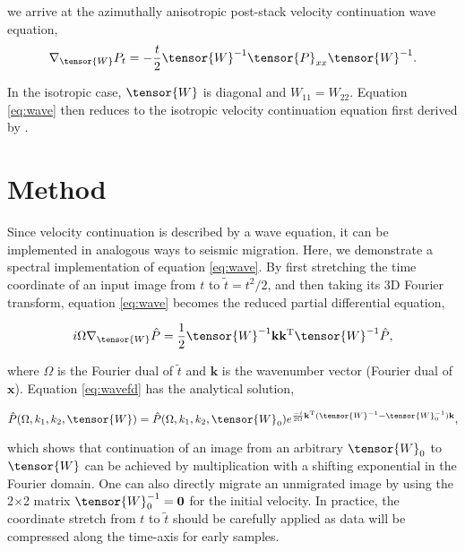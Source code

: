 \noindent we arrive at the azimuthally anisotropic post-stack velocity continuation wave equation,
\begin{equation}
\label{eq:wave}
\nabla _{\tensor{W}}P_t=-\frac{t}{2}\tensor{W}^{-1}\tensor{P}_{xx}\tensor{W}^{-1}.
\end{equation}

\noindent In the isotropic case, $\tensor{W}$ is diagonal and $W_{11}=W_{22}$.  
Equation \ref{eq:wave} then reduces to the isotropic velocity continuation equation first derived by \cite{Claerbout.sep.48.79}.

\section{Method}
Since velocity continuation is described by a wave equation, it can be implemented in analogous ways to seismic migration.  Here, we demonstrate a spectral implementation of equation \ref{eq:wave}.  
By first stretching the time coordinate of an input image from $t$ to $\tilde{t} =t^2/2$, and then taking its 3D Fourier transform, equation \ref{eq:wave} becomes the reduced partial differential equation,

\begin{equation}
\label{eq:wavefd}
i\Omega \nabla _{\tensor{W}}\hat{P} =\frac{1}{2}\tensor{W}^{-1}\mathbf{k}\mathbf{k}^{\mathrm{T}}\tensor{W}^{-1}\hat{P},
\end{equation}

\noindent where $\Omega $ is the Fourier dual of $\tilde{t} $ and $\mathbf{k}$ is the wavenumber vector (Fourier dual of $\mathbf{x}$).  
Equation \ref{eq:wavefd} has the analytical solution,

\begin{equation}
\label{eq:solution}
\hat{P}(\Omega ,k_1,k_2,\tensor{W})=\hat{P}(\Omega ,k_1,k_2,\tensor{W}_0)e^{\frac{-i}{2\Omega }\mathbf{k}^{\mathrm{T}}(\tensor{W}^{-1}-\tensor{W}^{-1}_0)\mathbf{k}},
\end{equation}

\noindent which shows that continuation of an image from an arbitrary $\tensor{W}_0$ to $\tensor{W}$ can be achieved by multiplication with a shifting exponential in the Fourier domain.  One can also directly migrate an unmigrated image by using the 2$\times $2 matrix $\tensor{W}_0^{-1} = \mathbf{0}$ for the initial velocity.
In practice, the coordinate stretch from $t$ to $\tilde{t}$ should be carefully applied as data will be compressed along the time-axis for early samples. 

